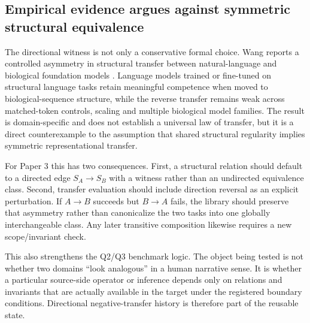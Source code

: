 \subsection{Empirical evidence argues against symmetric structural equivalence}

The directional witness is not only a conservative formal choice. Wang reports a controlled asymmetry in structural transfer between natural-language and biological foundation models \cite{wang2026asymmetry}. Language models trained or fine-tuned on structural language tasks retain meaningful competence when moved to biological-sequence structure, while the reverse transfer remains weak across matched-token controls, scaling and multiple biological model families. The result is domain-specific and does not establish a universal law of transfer, but it is a direct counterexample to the assumption that shared structural regularity implies symmetric representational transfer.

For Paper 3 this has two consequences. First, a structural relation should default to a directed edge $S_A\to S_B$ with a witness rather than an undirected equivalence class. Second, transfer evaluation should include direction reversal as an explicit perturbation. If $A\to B$ succeeds but $B\to A$ fails, the library should preserve that asymmetry rather than canonicalize the two tasks into one globally interchangeable class. Any later transitive composition likewise requires a new scope/invariant check.

This also strengthens the Q2/Q3 benchmark logic. The object being tested is not whether two domains ``look analogous'' in a human narrative sense. It is whether a particular source-side operator or inference depends only on relations and invariants that are actually available in the target under the registered boundary conditions. Directional negative-transfer history is therefore part of the reusable state.
